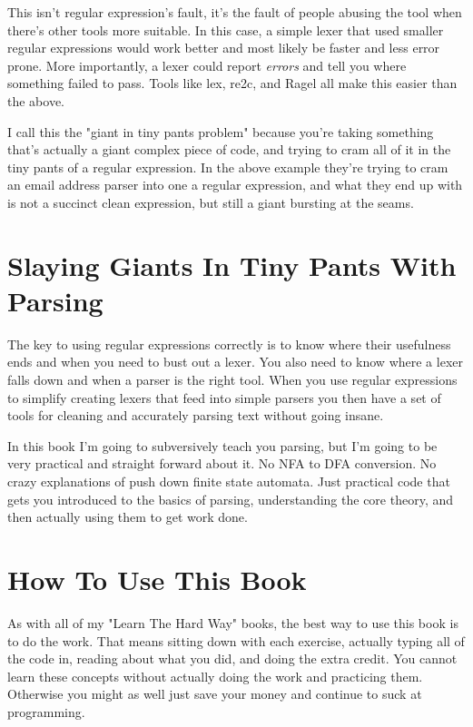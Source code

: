 This isn't regular expression's fault, it's the fault of people abusing the
tool when there's other tools more suitable.  In this case, a simple lexer
that used smaller regular expressions would work better and most likely
be faster and less error prone.  More importantly, a lexer could report
\emph{errors} and tell you where something failed to pass.  Tools like lex,
re2c, and Ragel all make this easier than the above.

I call this the "giant in tiny pants problem" because you're taking something
that's actually a giant complex piece of code, and trying to cram all of it
in the tiny pants of a regular expression.  In the above example they're trying
to cram an email address parser into one a regular expression, and what they
end up with is not a succinct clean expression, but still a giant bursting at
the seams.

\section{Slaying Giants In Tiny Pants With Parsing}

The key to using regular expressions correctly is to know where their
usefulness ends and when you need to bust out a lexer.  You also need to know
where a lexer falls down and when a parser is the right tool.  When you
use regular expressions to simplify creating lexers that feed into simple
parsers you then have a set of tools for cleaning and accurately parsing
text without going insane.

In this book I'm going to subversively teach you parsing, but I'm going
to be very practical and straight forward about it.  No NFA to DFA conversion.
No crazy explanations of push down finite state automata.  Just practical
code that gets you introduced to the basics of parsing, understanding the
core theory, and then actually using them to get work done.


\section{How To Use This Book}

As with all of my "Learn The Hard Way" books, the best way to use this
book is to do the work.  That means sitting down with each exercise,
actually typing all of the code in, reading about what you did, and
doing the extra credit.  You cannot learn these concepts without
actually doing the work and practicing them.  Otherwise you might
as well just save your money and continue to suck at programming.

